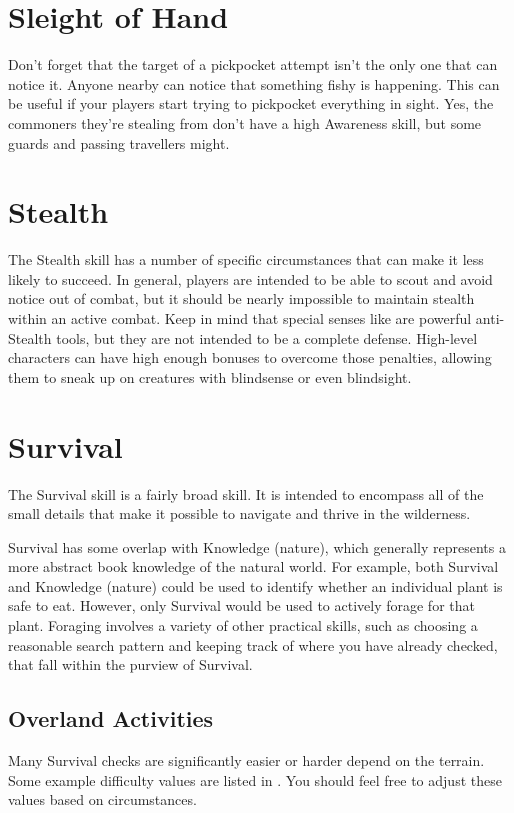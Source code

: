 \section{Sleight of Hand}
  Don't forget that the target of a pickpocket attempt isn't the only one that can notice it.
  Anyone nearby can notice that something fishy is happening.
  This can be useful if your players start trying to pickpocket everything in sight.
  Yes, the commoners they're stealing from don't have a high Awareness skill, but some guards and passing travellers might.


\section{Stealth}
  The Stealth skill has a number of specific circumstances that can make it less likely to succeed.
  In general, players are intended to be able to scout and avoid notice out of combat, but it should be nearly impossible to maintain stealth within an active combat.
  Keep in mind that special senses like  are powerful anti-Stealth tools, but they are not intended to be a complete defense.
  High-level characters can have high enough bonuses to overcome those penalties, allowing them to sneak up on creatures with blindsense or even blindsight.

\section{Survival}
  The Survival skill is a fairly broad skill.
  It is intended to encompass all of the small details that make it possible to navigate and thrive in the wilderness.

  Survival has some overlap with Knowledge (nature), which generally represents a more abstract book knowledge of the natural world.
  For example, both Survival and Knowledge (nature) could be used to identify whether an individual plant is safe to eat.
  However, only Survival would be used to actively forage for that plant.
  Foraging involves a variety of other practical skills, such as choosing a reasonable search pattern and keeping track of where you have already checked, that fall within the purview of Survival.

  \subsection{Overland Activities}
    Many Survival checks are significantly easier or harder depend on the terrain.
    Some example difficulty values are listed in .
    You should feel free to adjust these values based on circumstances.

